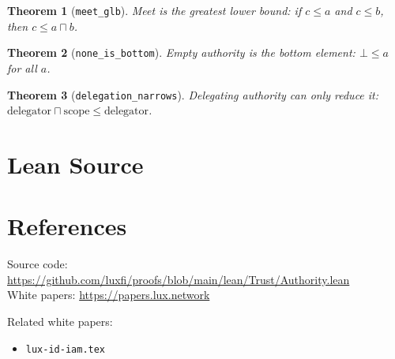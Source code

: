 \documentclass[11pt]{article}
\newtheorem{theorem}{Theorem}
\begin{document}
\begin{theorem}[\texttt{meet\_glb}]
Meet is the greatest lower bound: if $c \leq a$ and $c \leq b$, then $c \leq a \sqcap b$.
\end{theorem}

\begin{theorem}[\texttt{none\_is\_bottom}]
Empty authority is the bottom element: $\bot \leq a$ for all $a$.
\end{theorem}

\begin{theorem}[\texttt{delegation\_narrows}]
Delegating authority can only reduce it: $\text{delegator} \sqcap \text{scope} \leq \text{delegator}$.
\end{theorem}


\section{Lean Source}


\section{References}
\noindent Source code: \url{https://github.com/luxfi/proofs/blob/main/lean/Trust/Authority.lean}\\
\noindent White papers: \url{https://papers.lux.network}

\noindent Related white papers:
\begin{itemize}
  \item \texttt{lux-id-iam.tex}
\end{itemize}
\end{document}
